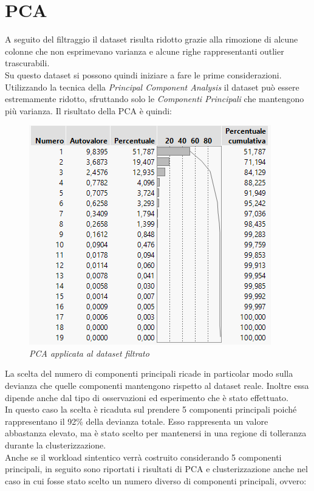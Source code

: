 \section{PCA}
A seguito del filtraggio il dataset risulta ridotto grazie alla rimozione di alcune colonne che non esprimevano varianza e alcune righe rappresentanti outlier trascurabili.
\\Su questo dataset si possono quindi iniziare a fare le prime considerazioni.
\\Utilizzando la tecnica della \textit{Principal Component Analysis} il dataset può essere estremamente ridotto, sfruttando solo le \textit{Componenti Principali} che mantengono più varianza. Il risultato della PCA è quindi:
\begin{figure}[H]
	\centering
	\includegraphics{img/hw1/pca.png}
	\caption{\textit{PCA applicata al dataset filtrato}}
\end{figure}
La scelta del numero di componenti principali ricade in particolar modo sulla devianza che quelle componenti mantengono rispetto al dataset reale. Inoltre essa dipende anche dal tipo di osservazioni ed esperimento che è stato effettuato.
\\In questo caso la scelta è ricaduta sul prendere 5 componenti principali poiché rappresentano il 92\% della devianza totale. Esso rappresenta un valore abbastanza elevato, ma è stato scelto per mantenersi in una regione di tolleranza durante la clusterizzazione. 
\\Anche se il workload sintentico verrà costruito considerando 5 componenti principali, in seguito sono riportati i risultati di PCA e clusterizzazione anche nel caso in cui fosse stato scelto un numero diverso di componenti principali, ovvero:
